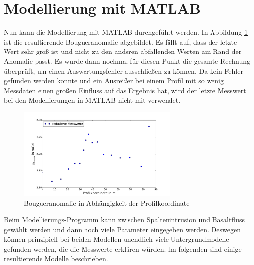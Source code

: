 \section{Modellierung mit MATLAB}

Nun kann die Modellierung mit MATLAB durchgeführt werden. In Abbildung \ref{fig:Bougueranomalie} ist die resultierende Bougueranomalie abgebildet. Es fällt auf, dass der letzte Wert sehr groß ist und nicht zu den anderen abfallenden Werten am Rand der Anomalie passt. Es wurde dann nochmal für diesen Punkt die gesamte Rechnung überprüft, um einen Auswertungsfehler ausschließen zu können. Da kein Fehler gefunden werden konnte und ein Ausreißer bei einem Profil mit so wenig Messdaten einen großen Einfluss auf das Ergebnis hat, wird der letzte Messwert bei den Modellierungen in MATLAB nicht mit verwendet. 

\begin{figure}[!ht]
 \centering
 \includegraphics[width=0.7\textwidth]{fig/Plot_Bouguer_mit_letztem_Punkt}
 \caption{Bougueranomalie in Abhängigkeit der Profilkoordinate}
 \label{fig:Bougueranomalie}
\end{figure}

Beim Modellierungs-Programm kann zwischen Spaltenintrusion und Basaltfluss gewählt werden und dann noch viele Parameter eingegeben werden. Deswegen können prinzipiell bei beiden Modellen unendlich viele Untergrundmodelle gefunden werden, die die Messwerte erklären würden. Im folgenden sind einige resultierende Modelle beschrieben.

